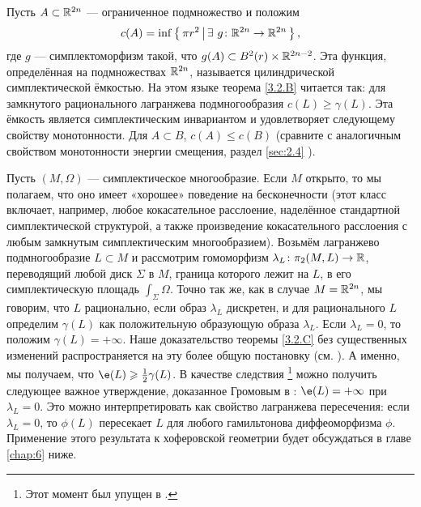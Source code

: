 \begin{thm}{}\label{3.2.F}
\end{thm}

Пусть $A \subset \mathbb{R}^{2n}$ --- ограниченное подмножество и положим 
\[c(A) = \inf \left\{ \,{\pi r^2}\, \middle| \,{ \exists\  g\colon \mathbb{R}^{2n} \to \mathbb{R}^{2n}}\, \right\},\]
где $g$ --- симплектоморфизм такой, что $g (A) \subset B^2 (r) \times \mathbb{R}^{2n - 2}$.
Эта функция, определённая на подмножествах $\mathbb{R}^{2n}$, называется цилиндрической симплектической ёмкостью.
На этом языке теорема \ref{3.2.B} читается так:
для замкнутого рационального лагранжева подмногообразия $c(L) \ge \gamma (L)$.
Эта ёмкость является симплектическим инвариантом и удовлетворяет следующему свойству монотонности.
Для $A \subset B$, $c (A) \le c (B)$ (сравните с аналогичным свойством
монотонности энергии смещения, раздел \ref{sec:2.4} ).

\begin{thm}{}\label{3.2.G}
\end{thm}

Пусть $(M, \Omega)$ --- симплектическое многообразие.
Если $M$ открыто, то мы полагаем, что оно имеет «хорошее» поведение на
бесконечности (этот класс включает, например, любое кокасательное
расслоение, наделённое стандартной симплектической структурой, а также
произведение кокасательного расслоения с любым замкнутым
симплектическим многообразием). 
Возьмём лагранжево подмногообразие $L \subset M$ и рассмотрим
гомоморфизм $\lambda_L\colon \pi_2 (M, L) \to \mathbb{R}$, переводящий любой
диск $\Sigma$ в $M$, граница которого лежит на $L$, в его
симплектическую площадь $\int_\Sigma \Omega$. 
Точно так же, как в случае $M = \mathbb{R}^{2n}$, мы говорим, что $L$
рационально, если образ $\lambda_L$ дискретен, и для рационального $L$
определим $\gamma (L)$ как положительную образующую образа
$\lambda_L$. 
Если $\lambda_L = 0$, то положим $\gamma (L) = + \infty$.
Наше доказательство теоремы \ref{3.2.C} без существенных изменений
распространяется на эту более общую постановку (см. \cite{P1}). 
А именно, мы получаем, что $\e (L) \ge \tfrac12 \gamma (L)$.
В качестве следствия%
\footnote{Этот момент был упущен в \cite[с. 359]{P1}.}
можно получить следующее важное утверждение, доказанное Громовым в \cite{G1}:
$\e (L) = + \infty$ при $\lambda_L = 0$.
Это можно интерпретировать как свойство лагранжева пересечения: если $\lambda_L = 0$, то $\phi (L)$ пересекает $L$ для любого гамильтонова диффеоморфизма $\phi$.
Применение этого результата к хоферовской геометрии будет обсуждаться в главе \ref{chap:6} ниже.

